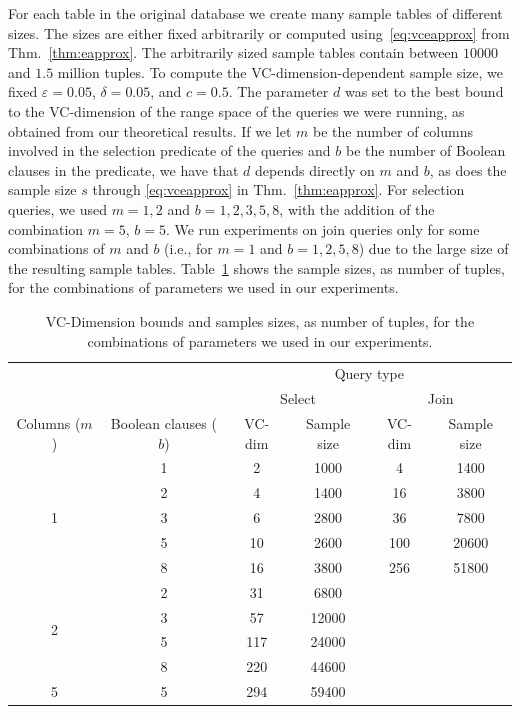 For each table in the original database we create many sample tables of
different sizes. The sizes are either fixed arbitrarily or computed
using~\eqref{eq:vceapprox} from Thm.~\ref{thm:eapprox}. The arbitrarily sized
sample tables contain between $10000$ and $1.5$ million tuples. To compute the
VC-dimension-dependent sample size, we fixed $\varepsilon=0.05$,
$\delta=0.05$, and $c=0.5$. The parameter $d$ was set to the best bound to the
VC-dimension of the range space of the queries we were running, as obtained from
our theoretical results. If we let $m$ be the number of columns involved in the
selection predicate of the queries and $b$ be the number of Boolean clauses in
the predicate, we have that $d$ depends directly on $m$ and $b$, as does the
sample size $s$ through \eqref{eq:vceapprox} in Thm.~\ref{thm:eapprox}. For
selection queries, we used $m=1,2$ and $b=1,2,3,5,8$, with the addition of the
combination $m=5$, $b=5$. We run experiments on join queries only for some
combinations of $m$ and $b$ (i.e., for $m=1$ and $b=1,2,5,8$) due to the large
size of the resulting sample tables. Table~\ref{tab:samplesize} shows the sample
sizes, as number of tuples, for the combinations of parameters we used in our
experiments.

\begin{table}[htb]
  \centering
  \begin{tabular}{cccccc}
    \toprule
    & & \multicolumn{4}{c}{Query type} \\
    \cmidrule(l){3-6}
    & &
    \multicolumn{2}{c}{Select} &
    \multicolumn{2}{c}{Join} \\
    \cmidrule(l){3-4} \cmidrule(l){5-6} 
    Columns ($m$) & Boolean clauses ($b$) & VC-dim & Sample size & VC-dim & Sample size \\
    \midrule
    \multirow{5}{*}{1} & 1 & 2 & 1000 & 4 & 1400\\
     & 2 & 4 & 1400 & 16 & 3800\\
     & 3 & 6 & 2800 & 36 & 7800 \\
     & 5 & 10 & 2600 & 100 & 20600\\
     & 8 & 16 & 3800 & 256 & 51800\\
     \midrule
    \multirow{4}{*}{2} & 2 & 31 & 6800  & & \\
     & 3 & 57 & 12000 & & \\
     & 5 & 117 & 24000 & & \\
     & 8 & 220 & 44600 & & \\
     \midrule
    5 & 5 & 294 & 59400 & & \\
    \bottomrule
  \end{tabular}
  \caption{VC-Dimension bounds and samples sizes, as number of tuples, for the
  combinations of parameters we used in our experiments. }
  \label{tab:samplesize}
\end{table}
 
